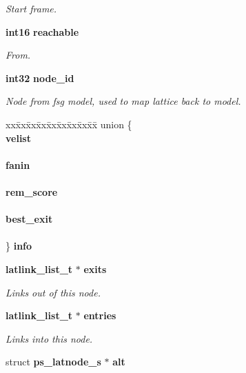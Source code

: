 \begin{DoxyCompactItemize}
\begin{DoxyCompactList}\small\item\em \-Start frame. \end{DoxyCompactList}\item 
{\bf int16} {\bf reachable}
\begin{DoxyCompactList}\small\item\em \-From. \end{DoxyCompactList}\item 
{\bf int32} {\bf node\-\_\-id}\label{structps__latnode__s_a50d14c033652a4fb387f76881df1c3f6}

\begin{DoxyCompactList}\small\item\em \-Node from fsg model, used to map lattice back to model. \end{DoxyCompactList}\item 
\begin{tabbing}
xx\=xx\=xx\=xx\=xx\=xx\=xx\=xx\=xx\=\kill
union \{\\
 {\bf velist}\\
\>\\
 {\bf fanin}\\
\>\\
 {\bf rem\_score}\\
\>\\
 {\bf best\_exit}\\
\>\\
\} {\bfseries info}\label{structps__latnode__s_a08268f9ec02dc27bead7ad7524838969}
\\

\end{tabbing}\item 
{\bf latlink\-\_\-list\-\_\-t} $\ast$ {\bf exits}\label{structps__latnode__s_a5232eefbc6e800b77e7a3c8ee3f4135d}

\begin{DoxyCompactList}\small\item\em \-Links out of this node. \end{DoxyCompactList}\item 
{\bf latlink\-\_\-list\-\_\-t} $\ast$ {\bf entries}\label{structps__latnode__s_a051a7eed31e29dd75151d1b34cc4eefa}

\begin{DoxyCompactList}\small\item\em \-Links into this node. \end{DoxyCompactList}\item 
struct {\bf ps\-\_\-latnode\-\_\-s} $\ast$ {\bf alt}\label{structps__latnode__s_aa4c0a395c74acbacccde561f92fa89e4}


\end{DoxyCompactItemize}
